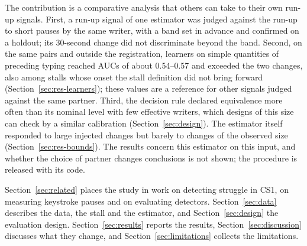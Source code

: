 The contribution is a comparative analysis that others can take to their own run-up signals. First, a run-up signal of
one estimator was judged against the run-up to short pauses by the same writer, with a band set in advance and confirmed
on a holdout; its 30-second change did not discriminate beyond the band. Second, on the same pairs and outside the
registration, learners on simple quantities of preceding typing reached AUCs of about 0.54--0.57 and exceeded the two
changes, also among stalls whose onset the stall definition did not bring forward (Section~\ref{sec:res-learners});
these values are a reference for other signals judged against the same partner. Third, the decision rule declared
equivalence more often than its nominal level with few effective writers, which designs of this size can check by a
similar calibration (Section~\ref{sec:design}). The estimator itself responded to large injected changes but barely to
changes of the observed size (Section~\ref{sec:res-bounds}). The results concern this estimator on this input, and
whether the choice of partner changes conclusions is not shown; the procedure is released with its code.

Section~\ref{sec:related} places the study in work on detecting struggle in CS1, on measuring keystroke pauses and on
evaluating detectors. Section~\ref{sec:data} describes the data, the stall and the estimator, and
Section~\ref{sec:design} the evaluation design. Section~\ref{sec:results} reports the results,
Section~\ref{sec:discussion} discusses what they change, and Section~\ref{sec:limitations} collects the limitations.
